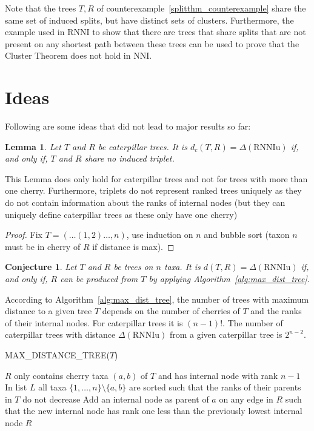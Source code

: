 \documentclass[11pt, a4paper]{article}
\newcommand{\nni}{\mathrm{NNI}}
\newcommand{\rnni}{\mathrm{RNNI}}
\newcommand{\rnniu}{\mathrm{RNNIu}}
\newtheorem{conjecture}[definition]{Conjecture}
\newtheorem{lemma}[definition]{Lemma}
\begin{document}
Note that the trees $T, R$ of counterexample~\ref{splitthm_counterexample} share the same set of induced splits, but have distinct sets of clusters.
Furthermore, the example used in $\rnni$ to show that there are trees that share splits that are not present on any shortest path between these trees can be used to prove that the Cluster Theorem does not hold in $\nni$.


\section{Ideas}

Following are some ideas that did not lead to major results so far:

\begin{lemma}
    Let $T$ and $R$ be caterpillar trees.
    It is $d_c(T,R) = \Delta(\rnniu)$ if, and only if, $T$ and $R$ share no induced triplet.
\end{lemma}

This Lemma does only hold for caterpillar trees and not for trees with more than one cherry.
Furthermore, triplets do not represent ranked trees uniquely as they do not contain information about the ranks of internal nodes (but they can uniquely define caterpillar trees as these only have one cherry)

\begin{proof}
    Fix $T = (\ldots(1,2) \ldots ,n)$, use induction on $n$ and bubble sort (taxon $n$ must be in cherry of $R$ if distance is max).
\end{proof}

\begin{conjecture}
    Let $T$ and $R$ be trees on $n$ taxa.
    It is $d(T,R) = \Delta(\rnniu)$ if, and only if, $R$ can be produced from $T$ by applying Algorithm~\ref{alg:max_dist_tree}.
\end{conjecture}

According to Algorithm~\ref{alg:max_dist_tree}, the number of trees with maximum distance to a given tree $T$ depends on the number of cherries of $T$ and the ranks of their internal nodes.
For caterpillar trees it is $(n-1)!$.
The number of caterpillar trees with distance $\Delta(\rnniu)$ from a given caterpillar tree is $2^{n-2}$.

\begin{algorithm}[H]
\caption{MAX\_DISTANCE\_TREE($T$)}
\label{alg:max_dist_tree}
\begin{algorithmic}[1]
	\STATE $R$ only contains cherry taxa $(a,b)$ of $T$ and has internal node with rank $n-1$
    \STATE In list $L$ all taxa $\{1,\ldots,n\}\setminus\{a,b\}$ are sorted such that the ranks of their parents in $T$ do not decrease
		\STATE Add an internal node as parent of $a$ on any edge in $R$ such that the new internal node has rank one less than the previously lowest internal node
	\ENDFOR
	\RETURN $R$
\end{algorithmic}
\end{algorithm}
\end{document}
